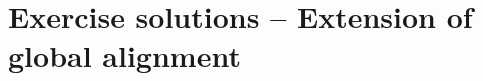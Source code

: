 \documentclass[12pt, answers]{exam}
\begin{document}
\section{Exercise solutions -- Extension of global alignment}

\begin{questions}


\pagebreak













\end{questions}
       
\end{document}
